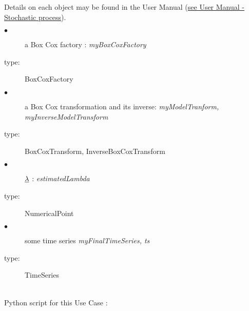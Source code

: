 Details on each object may be found in the User Manual  (\href{OpenTURNS_UserManual_TUI.pdf}{see User Manual - Stochastic process}).\\

 
{


  \begin{description}
  \item[$\bullet$] a Box Cox factory : {\itshape myBoxCoxFactory }
  \item[type:]  BoxCoxFactory
  \end{description}

  \begin{description}
  \item[$\bullet$] a Box Cox transformation and its inverse: {\itshape myModelTranform, myInverseModelTransform}
  \item[type:]  BoxCoxTransform, InverseBoxCoxTransform
  \end{description}


  \begin{description}
  \item[$\bullet$] ${\underline{\lambda}}$ : {\itshape estimatedLambda}
  \item[type:]  NumericalPoint
  \end{description}


  \begin{description}
  \item[$\bullet$] some time series {\itshape myFinalTimeSeries, ts}
  \item[type:]  TimeSeries 
  \end{description}
}

\textspace\\
Python script for this Use Case :

